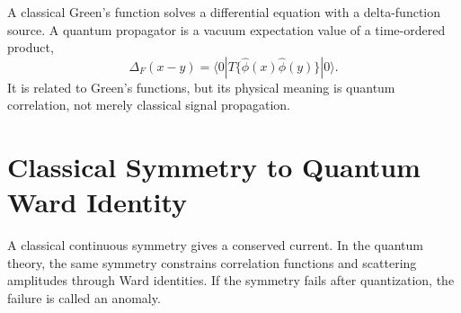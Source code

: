 A classical Green's function solves a differential equation with a delta-function
source. A quantum propagator is a vacuum expectation value of a time-ordered
product,
\[
    \Delta_F(x-y)
    = \langle 0|T\{\hat\phi(x)\hat\phi(y)\}|0\rangle.
\]
It is related to Green's functions, but its physical meaning is quantum
correlation, not merely classical signal propagation.

\section{Classical Symmetry to Quantum Ward Identity}

A classical continuous symmetry gives a conserved current. In the quantum
theory, the same symmetry constrains correlation functions and scattering
amplitudes through Ward identities. If the symmetry fails after quantization,
the failure is called an anomaly.

